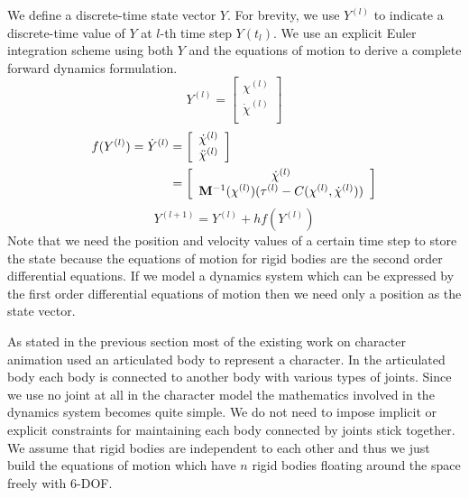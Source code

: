 \documentclass{acm_proc_article-sp}
\begin{document}
We define a discrete-time state vector $Y$. For brevity, we use $Y^{(l)}$
to indicate a discrete-time value of $Y$ at $l$-th time step $Y(t_l)$.
We use an explicit Euler integration
scheme using both $Y$ and the equations of motion to derive a complete
forward dynamics formulation.
\begin{equation}
Y^{(l)} =
\left[ {\begin{array}{cc}
 \chi^{(l)}   \\
 \dot\chi^{(l)}   \\
 \end{array} } \right]
\end{equation}
\begin{align}
f(Y^{(l)})=\dot{Y}^{(l)}
 &=
\left[ {\begin{array}{cc}
 \dot\chi^{(l)}   \\
 \ddot\chi^{(l)}   \\
 \end{array} } \right] \notag\\
 &=
\left[ {\begin{array}{cc}
 \dot\chi^{(l)}   \\
 \mathbf{M}^{-1}(\chi^{(l)}) ( \tau^{(l)} - C(\chi^{(l)},\dot\chi^{(l)}) )   \\
 \end{array} } \right]
\end{align}
\begin{equation}
Y^{(l+1)}=Y^{(l)}+hf(Y^{(l)})
\end{equation}
Note that we need the position and velocity values of a certain time step
to store the state because the equations of motion for rigid bodies
are the second order differential equations.
If we model a dynamics system
which can be expressed by the first order differential equations of motion
then we need only a position as the state vector.



As stated in the previous section most of the existing work on
character animation used an articulated body to represent a character.
In the articulated body each body is connected to another body with
various types of joints. Since we use no joint at all in the character
model the mathematics involved in the dynamics system becomes quite
simple. We do not need to impose implicit or explicit constraints for
maintaining each body connected by joints stick together.
We assume that rigid bodies are independent to each other and thus we just build the
equations of motion which have $n$ rigid bodies floating around the
space freely with 6-DOF.
\end{document}
